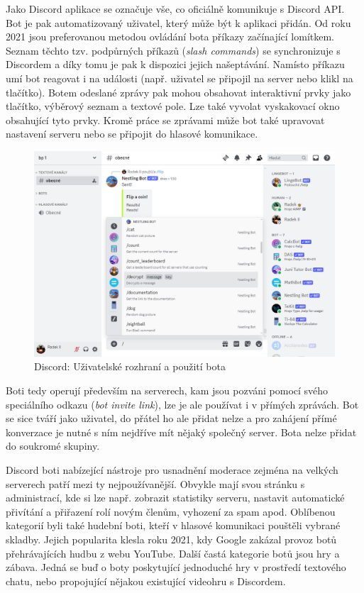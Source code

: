 \documentclass[FM]{tulthesis}
\begin{document}
	Jako Discord aplikace se označuje vše, co oficiálně komunikuje s Discord API. Bot je pak automatizovaný uživatel, který může být k aplikaci přidán. Od roku 2021 jsou preferovanou metodou ovládání bota příkazy začínající lomítkem. Seznam těchto tzv. podpůrných příkazů (\textit{slash commands}) se synchronizuje s Discordem a díky tomu je pak k dispozici jejich našeptávání. Namísto příkazu umí bot reagovat i na události (např. uživatel se připojil na server nebo klikl na tlačítko). Botem odeslané zprávy pak mohou obsahovat interaktivní prvky jako tlačítko, výběrový seznam a textové pole. Lze také vyvolat vyskakovací okno obsahující tyto prvky. Kromě práce se zprávami může bot také upravovat nastavení serveru nebo se připojit do hlasové komunikace. \cite{pdf_apps101}
	
	\begin{figure}[ht]
		\centering
		\includegraphics[width=\textwidth]{img/DiscordBotCommands}
		\caption{Discord: Uživatelské rozhraní a použití bota}
	\end{figure}
	
	Boti tedy operují především na serverech, kam jsou pozváni pomocí svého speciálního odkazu (\textit{bot invite link}), lze je ale používat i v přímých zprávách. Bot se sice tváří jako uživatel, do přátel ho ale přidat nelze a pro zahájení přímé konverzace je nutné s ním nejdříve mít nějaký společný server. Bota nelze přidat do soukromé skupiny. 
	
	Discord boti nabízející nástroje pro usnadnění moderace zejména na velkých serverech patří mezi ty nejpoužívanější. Obvykle mají svou stránku s administrací, kde si lze např. zobrazit statistiky serveru, nastavit automatické přivítání a přiřazení rolí novým členům, vyhození za spam apod. Oblíbenou kategorií byli také hudební boti, kteří v hlasové komunikaci pouštěli vybrané skladby. Jejich popularita klesla roku 2021, kdy Google zakázal provoz botů přehrávajících hudbu z webu YouTube. Další častá kategorie botů jsou hry a zábava. Jedná se buď o boty poskytující jednoduché hry v prostředí textového chatu, nebo propojující nějakou existující videohru s Discordem.
	
\end{document}
